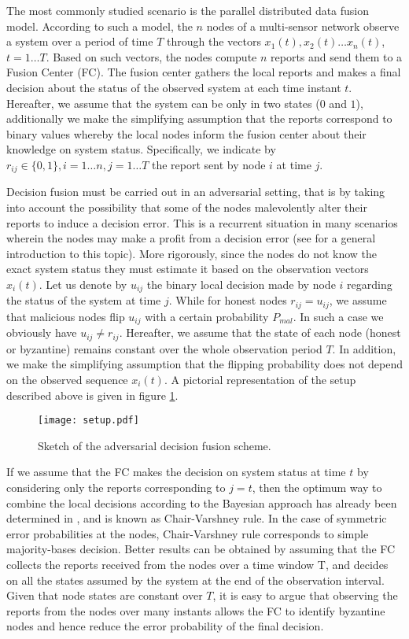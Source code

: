 \documentclass[10pt,peerreview,draftcls,onecolumn]{IEEEtran}
\begin{document}
The most commonly studied scenario is the parallel distributed data fusion model. According to such a model, the $n$ nodes of a multi-sensor network observe a system over a period of time $T$ through the vectors $x_1(t), x_2(t) \dots x_n(t)$, $t = 1 \dots T$. Based on such vectors, the nodes compute $n$ reports and send them to a Fusion Center (FC). The fusion center gathers the local reports and makes a final decision about the status of the observed system at each time instant $t$. Hereafter, we assume that the system can be only in two states ($0$ and $1$), additionally we make the simplifying assumption that the reports correspond to binary values whereby the local nodes inform the fusion center about their knowledge on system status. Specifically, we indicate by $r_{ij} \in \{0,1\}, i = 1 \dots n, j = 1 \dots T$ the report sent by node $i$ at time $j$.

Decision fusion must be carried out in an adversarial setting, that is by taking into account the possibility that some of the nodes malevolently alter their reports to induce a decision error. This is a recurrent situation in many scenarios wherein the nodes may make a profit from a decision error (see \cite{Vemp13} for a general introduction to this topic). More rigorously, since the nodes do not know the exact system status they must estimate it based on the observation vectors $x_i(t)$. Let us denote by $u_{ij}$ the binary local decision made by node $i$ regarding the status of the system at time $j$. While for honest nodes $r_{ij} = u_{ij}$, we assume that malicious nodes flip $u_{ij}$ with a certain probability $P_{mal}$. In such a case we obviously have $u_{ij} \ne r_{ij}$. Hereafter, we assume that the state of each node (honest or byzantine) remains constant over the whole observation period $T$. In addition, we make the simplifying assumption that the flipping probability does not depend on the observed sequence $x_i(t)$.
A pictorial representation of the setup described above is given in figure \ref{fig.setup}.
\begin{figure}[t!]
\centering
    \texttt{[image: setup.pdf]}
    \caption{Sketch of the adversarial decision fusion scheme. \vspace{-0.5cm}}
    \label{fig.setup}
\end{figure}
If we assume that the FC makes the decision on system status at time $t$ by considering only the reports corresponding to $j = t$, then the optimum way to combine the local decisions according to the Bayesian approach has already been determined in \cite{OptFusion,Var97}, and is known as Chair-Varshney rule. In the case of symmetric error probabilities at the nodes, Chair-Varshney rule corresponds to simple majority-bases decision.
Better results can be obtained by assuming that the FC collects the reports received from the nodes over a time window T, and decides on all the states assumed by the system at the end of the observation interval. Given that node states are constant over $T$, it is easy to argue that observing the reports from the nodes over many instants allows the FC to identify byzantine nodes and hence reduce the error probability of the final decision.
\end{document}

